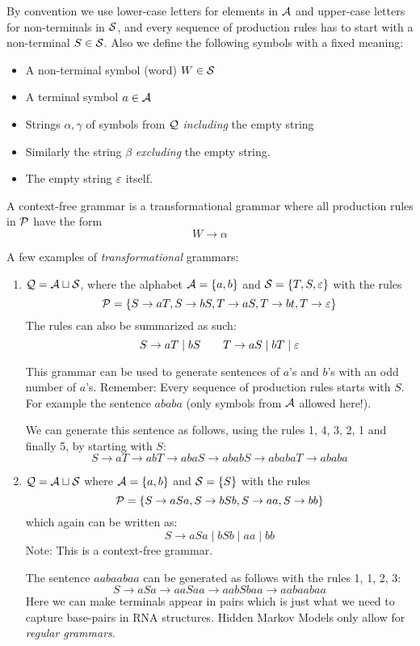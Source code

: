 By convention we use lower-case letters for elements in \(\mathcal{A}\) and
upper-case letters for non-terminals in \(\mathcal{S}\), and every sequence of
production rules has to start with a non-terminal \(S\in\mathcal{S}\).
Also we define the following symbols with a fixed meaning:
\begin{itemize}
\item A non-terminal symbol (word) \(W\in\mathcal{S}\)
\item A terminal symbol \(a\in\mathcal{A}\)
\item Strings \(\alpha,\gamma\) of symbols from \(\mathcal{Q}\) \emph{including} the
  empty string
\item Similarly the string \(\beta\) \emph{excluding} the empty string.
\item The empty string \(\varepsilon\) itself.
\end{itemize}

\begin{definition}
A context-free grammar is a transformational grammar where all production rules
in \(\mathcal{P}\) have the form
\[
  W \to \alpha
\]
\end{definition}

A few examples of \emph{transformational} grammars:
\begin{enumerate}[label=(\arabic*)]
\item \(\mathcal{Q}=\mathcal{A}\sqcup\mathcal{S}\), where the alphabet \(\mathcal{A}=\{a,b\}\)
  and \(\mathcal{S}=\{T,S,\varepsilon\}\) with the rules
  \[
    \mathcal{P}=\{ S\to aT, S\to bS, T\to aS, T\to bt, T\to \varepsilon \}
  \]
  The rules can also be summarized as such:
  \[
    S\to aT \mid bS \qquad T\to aS \mid bT \mid \varepsilon
  \]

  This grammar can be used to generate sentences of \(a\)'s and \(b\)'s with an
  odd number of \(a\)'s.  Remember: Every sequence of production rules starts
  with \(S\).  For example the sentence \(ababa\) (only symbols from
  \(\mathcal{A}\) allowed here!).

  We can generate this sentence as follows, using the rules 1, 4, 3, 2, 1 and
  finally 5, by starting with \(S\):
  \[
    S\to aT \to abT \to abaS \to ababS \to ababaT \to ababa
  \]
\item \(\mathcal{Q}=\mathcal{A}\sqcup\mathcal{S}\) where \(\mathcal{A}=\{a,b\}\) and
  \(\mathcal{S}=\{S\}\) with the rules
  \[
    \mathcal{P}=\{ S\to aSa, S\to bSb, S\to aa, S\to bb \}
  \]
  which again can be written as:
  \[
    S\to aSa \mid bSb \mid aa \mid bb
  \]
  Note: This is a context-free grammar.

  The sentence \(aabaabaa\) can be generated as follows with the rules
  1, 1, 2, 3:
  \[
    S\to aSa \to aaSaa \to aabSbaa \to aabaabaa
  \]
  Here we can make terminals appear in pairs which is just what we need to
  capture base-pairs in RNA structures.  Hidden Markov Models only allow for
  \emph{regular grammars}.
\end{enumerate}

